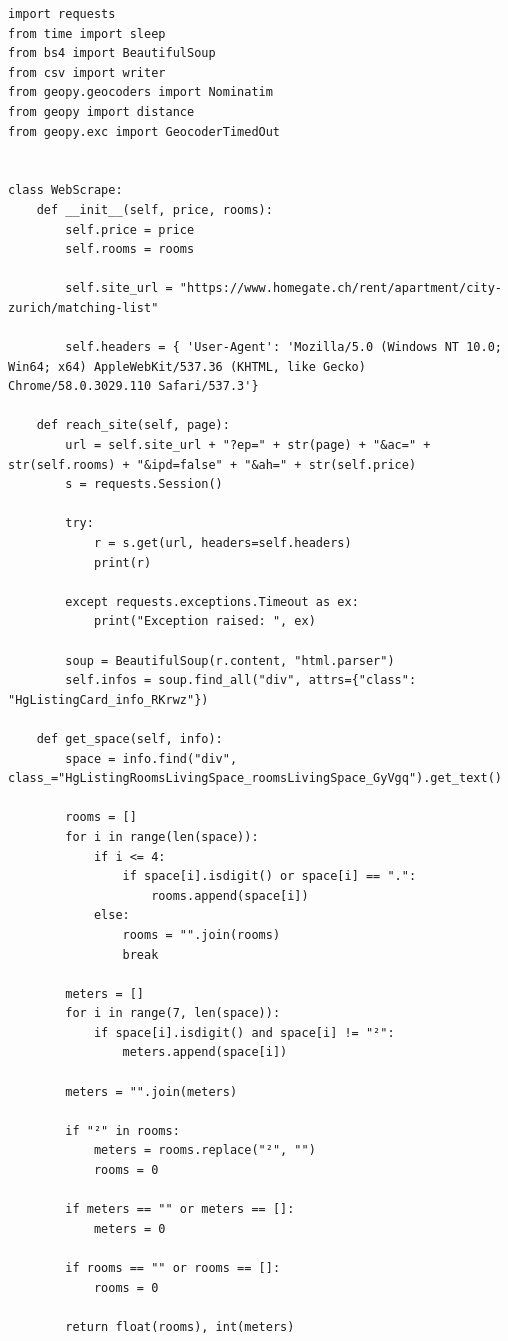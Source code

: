 \documentclass[12pt]{article}
\begin{document}
\lstset{language=Python}
\begin{lstlisting}
import requests
from time import sleep
from bs4 import BeautifulSoup
from csv import writer
from geopy.geocoders import Nominatim
from geopy import distance
from geopy.exc import GeocoderTimedOut


class WebScrape:
    def __init__(self, price, rooms):
        self.price = price
        self.rooms = rooms

        self.site_url = "https://www.homegate.ch/rent/apartment/city-zurich/matching-list"

        self.headers = { 'User-Agent': 'Mozilla/5.0 (Windows NT 10.0; Win64; x64) AppleWebKit/537.36 (KHTML, like Gecko) Chrome/58.0.3029.110 Safari/537.3'}

    def reach_site(self, page):
        url = self.site_url + "?ep=" + str(page) + "&ac=" + str(self.rooms) + "&ipd=false" + "&ah=" + str(self.price)
        s = requests.Session()

        try:
            r = s.get(url, headers=self.headers)
            print(r)

        except requests.exceptions.Timeout as ex:
            print("Exception raised: ", ex)

        soup = BeautifulSoup(r.content, "html.parser")
        self.infos = soup.find_all("div", attrs={"class": "HgListingCard_info_RKrwz"})

    def get_space(self, info):
        space = info.find("div", class_="HgListingRoomsLivingSpace_roomsLivingSpace_GyVgq").get_text()

        rooms = []
        for i in range(len(space)):
            if i <= 4:
                if space[i].isdigit() or space[i] == ".":
                    rooms.append(space[i])
            else:
                rooms = "".join(rooms)
                break

        meters = []
        for i in range(7, len(space)):
            if space[i].isdigit() and space[i] != "²":
                meters.append(space[i])

        meters = "".join(meters)

        if "²" in rooms:
            meters = rooms.replace("²", "")
            rooms = 0

        if meters == "" or meters == []:
            meters = 0

        if rooms == "" or rooms == []:
            rooms = 0

        return float(rooms), int(meters)


\end{lstlisting}
\end{document}
